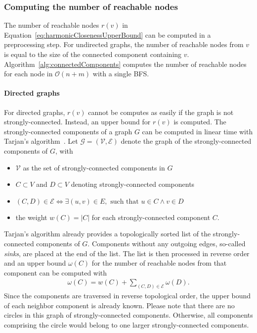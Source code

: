 \subsubsection{Computing the number of reachable nodes}
\label{sec:reachableNodes}
The number of reachable nodes $r(v)$ in Equation~\ref{eq:harmonicClosenessUpperBound} can be computed in a preprocessing step. For undirected graphs, the number of reachable nodes from $v$ is equal to the size of the connected component containing $v$. Algorithm~\ref{alg:connectedComponents} computes the number of reachable nodes for each node in $\mathcal{O}(n + m)$ with a single BFS.

\paragraph{Directed graphs}
 For directed graphs, $r(v)$ cannot be computes as easily if the graph is not strongly-connected. Instead, an upper bound for $r(v)$ is computed. The strongly-connected components of a graph $G$ can be computed in linear time with Tarjan's algorithm~\cite{tarjan1972depth}. Let $\mathcal{G = (V, E)}$ denote the graph of the strongly-connected components of $G$, with
 
 \begin{itemize}
 	\item $\mathcal{V}$ as the set of strongly-connected components in $G$
 	\item $C \subset V$ and $D \subset V$ denoting strongly-connected components
 	\item $(C, D) \in \mathcal{E} \iff \exists (u, v) \in E, \text{ such that } u \in C \land v \in D$ 
 	\item the weight $w(C) = |C|$ for each strongly-connected component $C$.
 \end{itemize}
 
 Tarjan's algorithm already provides a topologically sorted list of the strongly-connected components of $G$. Components without any outgoing edges, so-called \emph{sinks}, are placed at the end of the list. The list is then processed in reverse order and an upper bound $\omega(C)$ for the number of reachable nodes from that component can be computed with 
 \begin{align*}
 	\omega(C) = w(C) + \sum_{(C, D) \in \mathcal{E}}{\omega(D)}.
 \end{align*}
Since the components are traversed in reverse topological order, the upper bound of each neighbor component is already known. Please note that there are no circles in this graph of strongly-connected components. Otherwise, all components comprising the circle would belong to one larger strongly-connected components.

